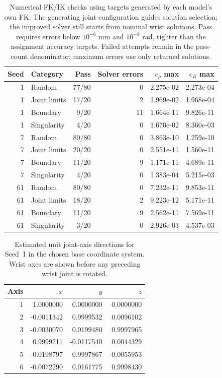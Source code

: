 \documentclass[11pt,letterpaper]{article}
\begin{document}
\begin{table}[H]\centering\small
\caption{Numerical FK/IK checks using targets generated by each model's own FK. The generating joint configuration guides solution selection; the improved solver still starts from nominal wrist solutions. Pass requires errors below $10^{-6}$ mm and $10^{-8}$ rad, tighter than the assignment accuracy targets. Failed attempts remain in the pass-count denominator; maximum errors use only returned solutions.}\label{tab:consistency}
\begin{tabular}{@{}rlrrrr@{}}\toprule
Seed & Category & Pass & Solver errors & $e_p$ max & $e_R$ max\\\midrule
1 & Random & 77/80 & 0 & 2.275e-02 & 2.273e-04\\
1 & Joint limits & 17/20 & 2 & 1.969e-02 & 1.968e-04\\
1 & Boundary & 9/20 & 11 & 1.664e-11 & 9.826e-11\\
1 & Singularity & 4/20 & 0 & 1.670e-02 & 8.360e-03\\
7 & Random & 80/80 & 0 & 3.863e-10 & 1.259e-10\\
7 & Joint limits & 20/20 & 0 & 2.551e-11 & 1.560e-11\\
7 & Boundary & 11/20 & 9 & 1.171e-11 & 4.689e-11\\
7 & Singularity & 4/20 & 0 & 1.383e-04 & 5.215e-03\\
61 & Random & 80/80 & 0 & 7.232e-11 & 9.853e-11\\
61 & Joint limits & 18/20 & 2 & 9.223e-12 & 5.171e-11\\
61 & Boundary & 11/20 & 9 & 2.562e-11 & 7.569e-11\\
61 & Singularity & 3/20 & 0 & 2.926e-03 & 4.537e-03\\
\bottomrule\end{tabular}
\end{table}
\begin{table}[H]\centering\small
\caption{Estimated unit joint-axis directions for Seed~1 in the chosen base coordinate system. Wrist axes are shown before any preceding wrist joint is rotated.}\label{tab:axes}
\begin{tabular}{@{}rrrr@{}}\toprule
Axis & $x$ & $y$ & $z$\\\midrule
1 & 1.0000000 & 0.0000000 & 0.0000000\\
2 & -0.0011342 & 0.9999532 & 0.0096102\\
3 & -0.0030070 & 0.0199480 & 0.9997965\\
4 & 0.9999211 & -0.0117540 & 0.0044329\\
5 & -0.0198797 & 0.9997867 & -0.0055953\\
6 & -0.0072290 & 0.0161775 & 0.9998430\\
\bottomrule\end{tabular}
\end{table}
\end{document}
